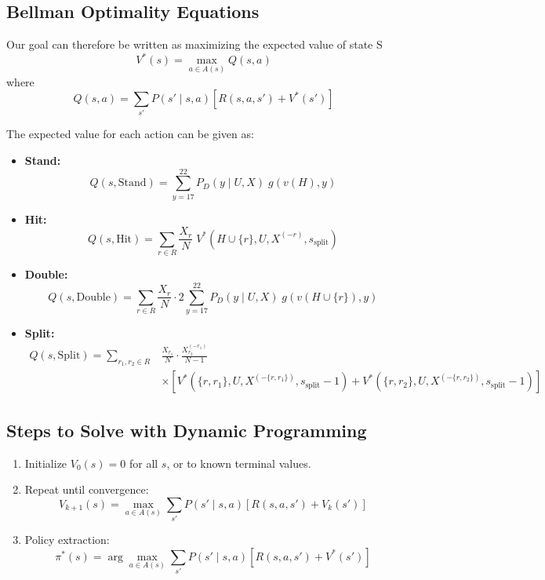 \documentclass[12pt,a4paper]{cibb}
\begin{document}
\subsection*{Bellman Optimality Equations}

Our goal can therefore be written as maximizing the expected value of state S
\[
  V^*(s) = \max_{a \in A(s)} Q(s, a)
\]
where
\[
  Q(s,a) = \sum_{s'} P(s' \mid s, a) \left[ R(s,a,s') + V^*(s') \right]
\]

The expected value for each action can be given as:

\begin{itemize}
  \item \textbf{Stand:}
  \[
    Q(s, \mathrm{Stand}) = \sum_{y=17}^{22} P_D(y \mid U, X)\; g(v(H), y)
  \]

  \item \textbf{Hit:}
  \[
    Q(s, \mathrm{Hit}) = \sum_{r \in R} \frac{X_r}{N}\; V^*(H \cup \{r\}, U, X^{(-r)}, s_{\text{split}})
  \]

  \item \textbf{Double:}
  \[
    Q(s, \mathrm{Double}) = \sum_{r \in R} \frac{X_r}{N} \cdot 2 \sum_{y=17}^{22} P_D(y \mid U, X)\; g(v(H \cup \{r\}), y)
  \]
  \item \textbf{Split:}
  \begin{align*}
    Q(s, \mathrm{Split}) =
    \sum_{r_1, r_2 \in R} & \frac{X_{r_1}}{N} \cdot \frac{X^{(-r_1)}_{r_2}}{N - 1} \\
    & \times \left[
      V^*(\{r, r_1\}, U, X^{(-\{r, r_1\})}, s_{\text{split}}-1)
      + V^*(\{r, r_2\}, U, X^{(-\{r, r_2\})}, s_{\text{split}}-1)
    \right]
  \end{align*}
\end{itemize}

\subsection{Steps to Solve with Dynamic Programming}

\begin{enumerate}
  \item Initialize \( V_0(s) = 0 \) for all \( s \), or to known terminal values.
  \item Repeat until convergence:
  \[
    V_{k+1}(s) = \max_{a \in A(s)} \sum_{s'} P(s' \mid s, a) [ R(s,a,s') + V_k(s') ]
  \]
  \item Policy extraction:
  \[
    \pi^*(s) = \arg\max_{a \in A(s)} \sum_{s'} P(s' \mid s,a) [ R(s,a,s') + V^*(s') ]
  \]
\end{enumerate}
\end{document}
